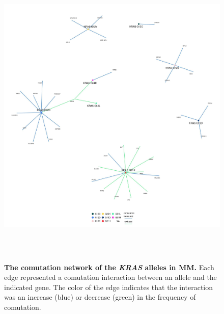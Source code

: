 \documentclass[english, 12pt, letterpaper]{article}
\newcommand{\KRAS}{\emph{KRAS}}
\begin{document}
\begin{figure}[p]
\centering
\includegraphics[height=150mm]{figures/SuppFigure_09.jpeg}
\caption{
    \textbf{The comutation network of the \KRAS{} alleles in MM.} Each edge represented a comutation interaction between an allele and the indicated gene. The color of the edge indicates that the interaction was an increase (blue) or decrease (green) in the frequency of comutation.
}
\label{sfig:mm_labeled-comutation}
\end{figure}
\end{document}
